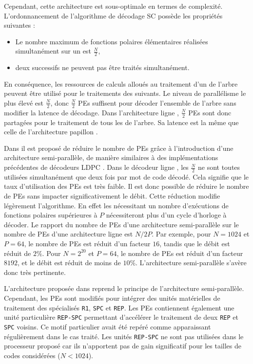 Cependant, cette architecture est sous-optimale en termes de complexité.
L'ordonnancement de l'algorithme de décodage SC possède les propriétés suivantes :
\begin{itemize}
  \item Le nombre maximum de fonctions polaires élémentaires réalisées simultanément sur un \noeud est $\frac{N}{2}$,
  \item deux \noeuds successifs ne peuvent pas être traités simultanément.
\end{itemize}
En conséquence, les ressources de calculs alloués au traitement d'un \noeud de l'arbre peuvent être utilisé pour le traitements des \noeuds suivants.
Le niveau de parallélisme le plus élevé est $\frac{N}{2}$, donc $\frac{N}{2}$ PEs suffisent pour décoder l'ensemble de l'arbre sans modifier la latence de décodage.
Dans l'architecture \og ligne \fg, $\frac{N}{2}$ PEs sont donc partagées pour le traitement de tous les \noeuds de l'arbre. Sa latence est la même que celle de l'architecture \og papillon \fg.

Dans \cite{leroux_semi-parallel_2013} il est proposé de réduire le nombre de PEs grâce à l'introduction d'une architecture semi-parallèle, de manière similaires à des implémentations précédentes de décodeurs LDPC \cite{1049697}. Dans le décodeur \og ligne \fg, les $\frac{N}{2}$ ne sont toutes utilisées simultanément que deux fois par mot de code décodé. Cela signifie que le taux d'utilisation des PEs est très faible. Il est donc possible de réduire le nombre de PEs sans impacter significativement le débit.
Cette réduction modifie légèrement l'algorithme. En effet les \noeuds nécessitant un nombre d'exécutions de fonctions polaires supérieures à $P$ nécessiteront plus d'un cycle d'horloge à décoder. Le rapport du nombre de PEs d'une architecture semi-parallèle sur le nombre de PEs d'une architecture \og ligne \fg est $N/2P$. Par exemple, pour $N=1024$ et $P=64$, le nombre de PEs est réduit d'un facteur $16$, tandis que le débit est réduit de $2\%$. Pour $N=2^{20}$ et $P=64$, le nombre de PEs est réduit d'un facteur $8192$, et le débit est réduit de moins de $10\%$. L'architecture semi-parallèle s'avère donc très pertinente.

L'architecture proposée dans \cite{sarkis_fast_2014} reprend le principe de l'architecture semi-parallèle. Cependant, les PEs sont modifiés pour intégrer des unités matérielles de traitement des \noeuds spécialisés \texttt{R1}, \texttt{SPC} et \texttt{REP}. Les PEs contiennent également une unité particulière \texttt{REP-SPC} permettant d’accélérer le traitement de deux \noeuds \texttt{REP} et \texttt{SPC} voisins. Ce motif particulier avait été repéré comme apparaissant régulièrement dans le cas traité. Les unités \texttt{REP-SPC} ne sont pas utilisées dans le processeur proposé car ils n'apportent pas de gain significatif pour les tailles de codes considérées ($N<1024$). 

